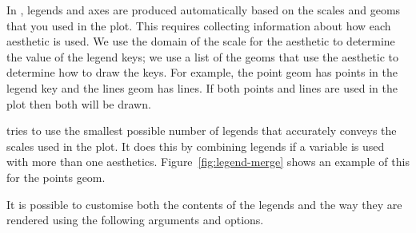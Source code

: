 In \ggplot, legends and axes are produced automatically based on the scales and geoms that you used in the plot. This requires collecting information about how each aesthetic is used. We use the domain of the scale for the aesthetic to determine the value of the legend keys; we use a list of the geoms that use the aesthetic to determine how to draw the keys. For example, the point geom has points in the legend key and the lines geom has lines. If both points and lines are used in the plot then both will be drawn.

\ggplot tries to use the smallest possible number of legends that accurately conveys the scales used in the plot.  It does this by combining legends if a variable is used with more than one aesthetics.  Figure~\ref{fig:legend-merge} shows an example of this for the points geom.  


% 



It is possible to customise both the contents of the legends and the way they are rendered using the following arguments and options.

